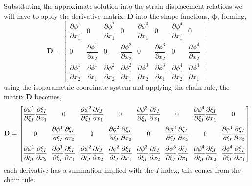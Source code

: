 \documentclass[11pt, a4paper]{article}
\numberwithin{equation}{section}
\begin{document}
Substituting the approximate solution into the strain-displacement relations we will have to apply the derivative matrix, $\mathbf{D}$ into the shape functions, $\boldsymbol \phi$, forming,
\begin{equation}
\mathbf{D} = 
\begin{bmatrix}
\dfrac{\partial \phi^1}{\partial x_1}  & 0 & \dfrac{\partial \phi^2}{\partial x_1}  & 0 & \dfrac{\partial \phi^3}{\partial x_1}  & 0 & \dfrac{\partial \phi^4}{\partial x_1}  & 0\\[0.4cm]
0 & \dfrac{\partial \phi^1}{\partial x_2} & 0 & \dfrac{\partial \phi^2}{\partial x_2} & 0 & \dfrac{\partial \phi^3}{\partial x_2} & 0 & \dfrac{\partial \phi^4}{\partial x_2} \\[0.4cm]
\dfrac{\partial \phi^1}{\partial x_2} & \dfrac{\partial \phi^1}{\partial x_1} & \dfrac{\partial \phi^2}{\partial x_2} & \dfrac{\partial \phi^2}{\partial x_1} & \dfrac{\partial \phi^3}{\partial x_2} & \dfrac{\partial \phi^3}{\partial x_1} & \dfrac{\partial \phi^4}{\partial x_2} & \dfrac{\partial \phi^4}{\partial x_1} 
\end{bmatrix}
\end{equation}
using the isoparametric coordinate system and applying the chain rule, the matrix $\mathbf{D}$ becomes,
\begin{equation}
\mathbf{D} = \arraycolsep=3pt
\begin{bmatrix}
\dfrac{\partial \phi^1}{\partial \xi_I} \dfrac{\partial \xi_I}{\partial x_1}  & 0 & \dfrac{\partial \phi^2}{\partial \xi_I} \dfrac{\partial \xi_I}{\partial x_1}  & 0 & \dfrac{\partial \phi^3}{\partial \xi_I} \dfrac{\partial \xi_I}{\partial x_1}  & 0 & \dfrac{\partial \phi^4}{\partial \xi_I} \dfrac{\partial \xi_I}{\partial x_1}  & 0
\\[0.4cm]
0 & \dfrac{\partial \phi^1}{\partial \xi_I} \dfrac{\partial \xi_I}{\partial x_2} & 0 & \dfrac{\partial \phi^2}{\partial \xi_I} \dfrac{\partial \xi_I}{\partial x_2}  & 0 & \dfrac{\partial \phi^3}{\partial \xi_I} \dfrac{\partial \xi_I}{\partial x_2}  & 0 & \dfrac{\partial \phi^4}{\partial \xi_I} \dfrac{\partial \xi_I}{\partial x_2} 
\\[0.4cm]
\dfrac{\partial \phi^1}{\partial \xi_I} \dfrac{\partial \xi_I}{\partial x_2}  & \dfrac{\partial \phi^1}{\partial \xi_I} \dfrac{\partial \xi_I}{\partial x_1}  & \dfrac{\partial \phi^2}{\partial \xi_I} \dfrac{\partial \xi_I}{\partial x_2}  & \dfrac{\partial \phi^2}{\partial \xi_I} \dfrac{\partial \xi_I}{\partial x_1} & \dfrac{\partial \phi^3}{\partial \xi_I} \dfrac{\partial \xi_I}{\partial x_2}  & \dfrac{\partial \phi^3}{\partial \xi_I} \dfrac{\partial \xi_I}{\partial x_1}  & \dfrac{\partial \phi^4}{\partial \xi_I} \dfrac{\partial \xi_I}{\partial x_2}  & \dfrac{\partial \phi^4}{\partial \xi_I} \dfrac{\partial \xi_I}{\partial x_1} 
\end{bmatrix}
\end{equation}
each derivative has a summation implied with the $I$ index, this comes from the chain rule.
\end{document}
